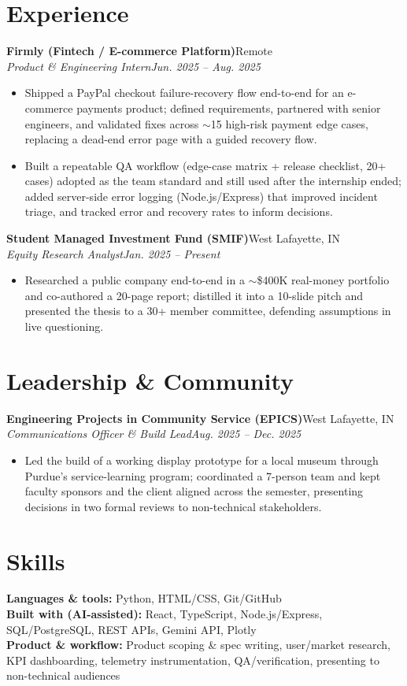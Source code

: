 \documentclass[10pt,letterpaper]{article}
\newcommand{\entry}[4]{%
  \textbf{#1}\hfill #2\\[1pt]
  \textit{#3}\hfill \textit{#4}\\[1pt]
}
\begin{document}
\section{Experience}
\entry{Firmly (Fintech / E-commerce Platform)}{Remote}{Product \& Engineering Intern}{Jun. 2025 -- Aug. 2025}
\begin{itemize}
  \item Shipped a PayPal checkout failure-recovery flow end-to-end for an e-commerce payments product; defined requirements, partnered with senior engineers, and validated fixes across $\sim$15 high-risk payment edge cases, replacing a dead-end error page with a guided recovery flow.
  \item Built a repeatable QA workflow (edge-case matrix + release checklist, 20+ cases) adopted as the team standard and still used after the internship ended; added server-side error logging (Node.js/Express) that improved incident triage, and tracked error and recovery rates to inform decisions.
\end{itemize}
\entry{Student Managed Investment Fund (SMIF)}{West Lafayette, IN}{Equity Research Analyst}{Jan. 2025 -- Present}
\begin{itemize}
  \item Researched a public company end-to-end in a $\sim$\$400K real-money portfolio and co-authored a 20-page report; distilled it into a 10-slide pitch and presented the thesis to a 30+ member committee, defending assumptions in live questioning.
\end{itemize}

\section{Leadership \& Community}
\entry{Engineering Projects in Community Service (EPICS)}{West Lafayette, IN}{Communications Officer \& Build Lead}{Aug. 2025 -- Dec. 2025}
\begin{itemize}
  \item Led the build of a working display prototype for a local museum through Purdue's service-learning program; coordinated a 7-person team and kept faculty sponsors and the client aligned across the semester, presenting decisions in two formal reviews to non-technical stakeholders.
\end{itemize}

\section{Skills}
\textbf{Languages \& tools:} Python, HTML/CSS, Git/GitHub\\
\textbf{Built with (AI-assisted):} React, TypeScript, Node.js/Express, SQL/PostgreSQL, REST APIs, Gemini API, Plotly\\
\textbf{Product \& workflow:} Product scoping \& spec writing, user/market research, KPI dashboarding, telemetry instrumentation, QA/verification, presenting to non-technical audiences
\end{document}

